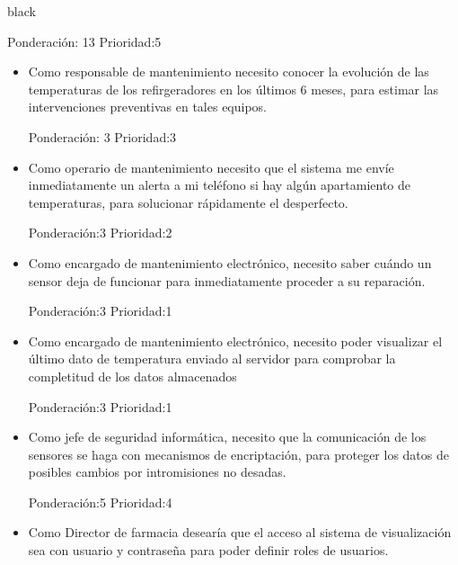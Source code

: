 \documentclass[11pt]{charter}
\begin{document}
\begin{consigna}{black}
\begin{itemize}
\begin{itemize}
Ponderación: 13 Prioridad:5
	\end{itemize}

\end{itemize}

\begin{itemize}
\item Como responsable de mantenimiento necesito conocer la evolución de las temperaturas de los refirgeradores en los últimos 6 meses, para estimar las intervenciones preventivas en tales equipos. 

Ponderación: 3 Prioridad:3
\end{itemize}


\begin{itemize}
\item Como operario de mantenimiento necesito que el sistema me envíe inmediatamente un alerta a mi teléfono si hay algún apartamiento de temperaturas, para solucionar rápidamente el desperfecto. 

Ponderación:3 Prioridad:2
\end{itemize}


\begin{itemize}
\item Como encargado de mantenimiento electrónico, necesito saber cuándo un sensor deja de funcionar para inmediatamente proceder a su reparación. 

Ponderación:3 Prioridad:1
\end{itemize}

\begin{itemize}
\item Como encargado de mantenimiento electrónico, necesito poder visualizar el último dato de temperatura enviado al servidor para comprobar la completitud de los datos almacenados

Ponderación:3 Prioridad:1
\end{itemize}


\begin{itemize}
\item Como jefe de seguridad informática, necesito que la comunicación de los sensores se haga con mecanismos de encriptación, para proteger los datos de posibles cambios por intromisiones no desadas. 

Ponderación:5 Prioridad:4
\end{itemize}


\begin{itemize}
\item Como Director de farmacia desearía que el acceso al sistema de visualización sea con usuario y contraseña para poder definir roles de usuarios. 


\end{itemize}
\end{consigna}
\end{document}
